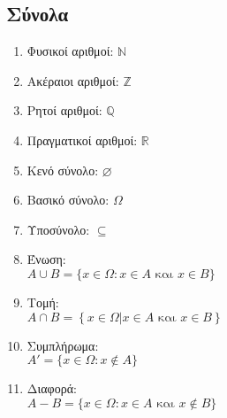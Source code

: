 \documentclass[twoside,nofonts,internet,math,spyros]{frontisthrio}
\begin{document}
\begin{mybox}[mysubtitle]{\section{Σύνολα}}
\begin{multicols}{2}
\begin{enumerate}[itemsep=0mm]
\item Φυσικοί αριθμοί: $ \mathbb{N} $
\item Ακέραιοι αριθμοί: $ \mathbb{Z} $
\item Ρητοί αριθμοί: $ \mathbb{Q} $
\item Πραγματικοί αριθμοί: $ \mathbb{R} $
\item Κενό σύνολο: $ \varnothing $
\item Βασικό σύνολο: $ \Omega $
\item Υποσύνολο: $ \subseteq $
\item Ένωση:\\$ A\cup B=\{x\in\Omega:x\in A\textrm{ και }x\in B \} $
\item Τομή:\\
$ A\cap B=\left\lbrace x\in\varOmega\left| x\in A \textrm{ και } x\in B\right.\right\rbrace $
\item Συμπλήρωμα:\\
$ A'=\{x\in\Omega:x\notin A\} $
\item Διαφορά:\\
$ A-B=\{x\in\Omega:x\in A\textrm{ και }x\notin B \} $
\end{enumerate}
\end{multicols}
\end{mybox}
\newpage
\orismoi
\end{document}
